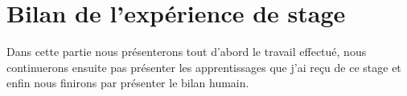 \newpage
\section{Bilan de l'expérience de stage}
Dans cette partie nous présenterons tout d'abord le travail effectué, nous continuerons ensuite pas présenter les apprentissages que j'ai reçu de ce stage et enfin nous finirons par présenter le bilan humain.



